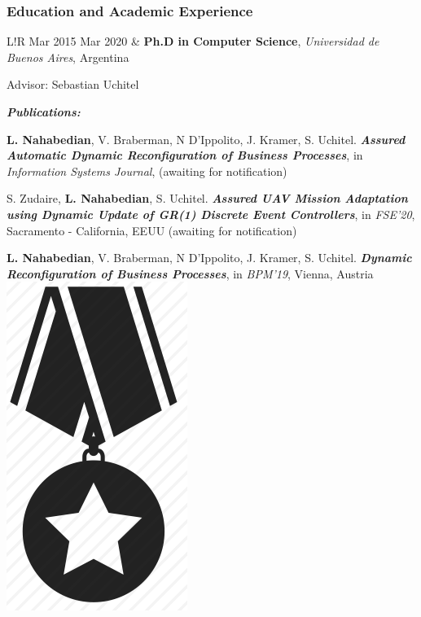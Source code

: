 \documentclass[10pt]{article}
\newcommand\VRule{\color{lightgray}\vrule width 0.5pt}
\begin{document}

\vspace{-0.5cm}
\subsubsection*{Education and Academic Experience}

\begin{tabular}{L!{\VRule}R}
	Mar 2015 Mar 2020 & \textbf{Ph.D in Computer Science}, 
	\textit{Universidad de Buenos Aires}, Argentina
	
	Advisor: Sebastian Uchitel
	
	\textit{\textbf{Publications:}}
	\begin{compactitem}
	\item \textbf{L. Nahabedian}, V. Braberman, N D'Ippolito, J. Kramer, S. 
	Uchitel.
	\textbf{\textit{Assured Automatic Dynamic Reconfiguration of Business 
	Processes}}, in 
	\textit{Information Systems Journal}, (awaiting for notification)
	\item S. Zudaire, \textbf{L. Nahabedian}, S. Uchitel.
	\textbf{\textit{Assured UAV Mission Adaptation using Dynamic Update
	of GR(1) Discrete Event Controllers}}, in \textit{FSE'20}, Sacramento - 
	California, EEUU (awaiting for notification) 
	\item \textbf{L. Nahabedian}, V. Braberman, N D'Ippolito, J. Kramer, S. 
	Uchitel.
	\textbf{\textit{Dynamic Reconfiguration of Business Processes}}, in 
	\textit{BPM'19}, Vienna, Austria 
	\includegraphics[scale=0.022]{../img/medal.png}

\end{compactitem}
\end{tabular}
\end{document}
